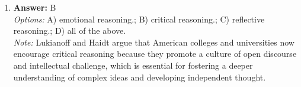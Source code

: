 \documentclass[12pt]{article}
\begin{document}
\begin{enumerate}[label=\arabic*.]
\\ \textit{Note:} Mengzi, also known as Mencius, emphasized the inherent goodness of human nature and the importance of natural development and processes, aligning him with naturalist philosophies that focus on natural elements and human relationships with the environment.
\item \textbf{Answer:} B
\\ \textit{Options:} A) emotional reasoning.; B) critical reasoning.; C) reflective reasoning.; D) all of the above.
\\ \textit{Note:} Lukianoff and Haidt argue that American colleges and universities now encourage critical reasoning because they promote a culture of open discourse and intellectual challenge, which is essential for fostering a deeper understanding of complex ideas and developing independent thought.
\end{enumerate}
\end{document}
